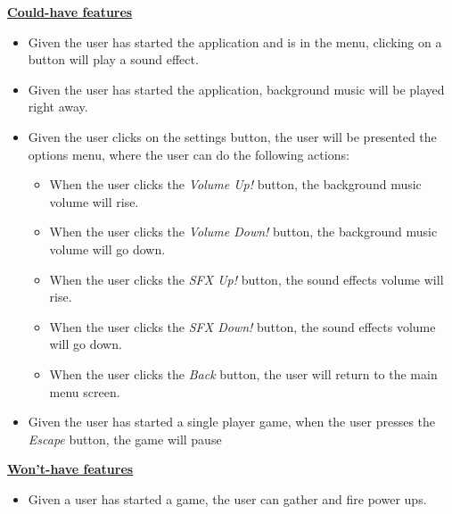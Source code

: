 \documentclass[a4paper,11pt]{article}
\begin{document}
\noindent
\textbf{\underline{Could-have features}}
\begin{itemize}
  \item Given the user has started the application and is in the menu,
  		clicking on a button will play a sound effect.
  \item Given the user has started the application,
  		background music will be played right away.
  \item Given the user clicks on the settings button,
		the user will be presented the options menu,
		where the user can do the following actions:
  \begin{itemize}
    \item When the user clicks the \textit{Volume Up!} button,
          the background music volume will rise.
    \item When the user clicks the \textit{Volume Down!} button,
          the background music volume will go down.
    \item When the user clicks the \textit{SFX Up!} button,
          the sound effects volume will rise.
    \item When the user clicks the \textit{SFX Down!} button,
          the sound effects volume will go down.
    \item When the user clicks the \textit{Back} button, 
          the user will return to the main menu screen.
  \end{itemize}
  \item Given the user has started a single player game,
        when the user presses the \textit{Escape} button, the game will pause
\end{itemize}

\noindent
\textbf{\underline{Won't-have features}}
\begin{itemize}
  \item Given a user has started a game, the user can gather and fire power ups.
\end{itemize}

\newpage
\end{document}
